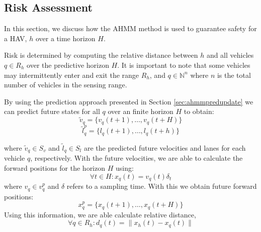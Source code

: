 \documentclass[letterpaper, 10 pt, conference]{ieeeconf}  %
\newcommand\NB[1]{$\spadesuit$\footnote{NB: #1}}
\newcommand\RP[1]{$\clubsuit$\footnote{RP: #1}}
\begin{document}
\subsection{Risk Assessment}

 In this section, we discuss how the AHMM method is used to guarantee safety for a HAV, $h$ over a time horizon $H$. 
 
 
 Risk is determined by computing the relative distance between $h$ and all vehicles $q\in R_h$ over the predictive horizon $H$. It is important to note that some vehicles may intermittently enter and exit the range $R_h$, and $q\in\mathbb{N}^n$
where $n$ is the total number of vehicles in the sensing range.


By using the prediction approach presented in Section \ref{sec:ahmmpredupdate} we can predict future states for all $q$ over an finite horizon $H$ to obtain:
\begin{equation}
    \tilde{v}_q = \{v_q(t+1),\ldots,v_q(t+H)\}
\end{equation}
\begin{equation}
    \tilde{l}_q^p = \{l_q(t+1),\ldots,l_q(t+h)\}
\end{equation}


where $\tilde{v}_q\in S_v$ and $\tilde{l}_q\in S_l$ are the predicted future velocities and lanes for each vehicle $q$, respectively.
With the future velocities, we are able to calculate the forward positions for the horizon $H$ using:
\begin{equation} \label{eq:dumpos}
    \forall{t}\in H: x_q(t) = v_q(t)\delta_t
\end{equation}
where $v_q\in v_q^p$ and $\delta$ refers to a sampling time. With this we obtain future forward positions:
\begin{equation}
    x_q^p = \{x_q(t+1),\ldots,x_q(t+H)\}
\end{equation}
Using this information, we are able calculate relative distance,
\begin{equation}
    \forall q \in R_h: d_q(t) = \lVert x_h(t)-x_q(t)\rVert
\end{equation}
\end{document}
